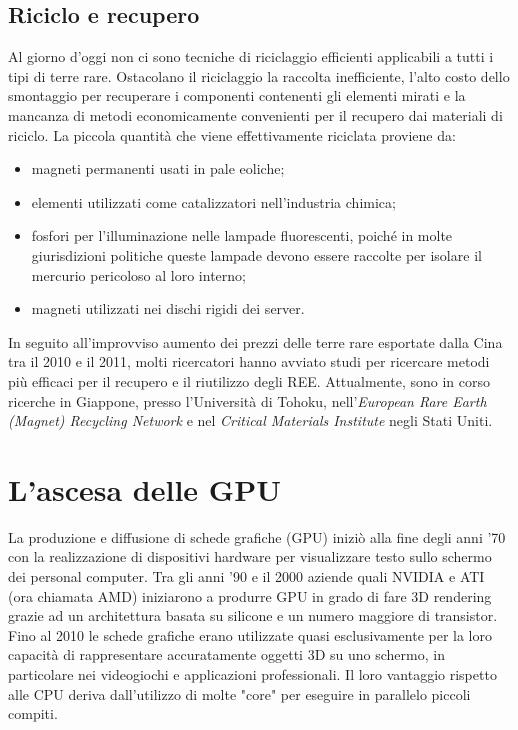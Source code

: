 \documentclass[12pt,a4paper,oneside]{book}
\begin{document}
\section{Riciclo e recupero}
Al giorno d'oggi non ci sono tecniche di riciclaggio efficienti applicabili a tutti i tipi di terre rare. Ostacolano il riciclaggio la raccolta inefficiente, l'alto costo dello smontaggio per recuperare i componenti contenenti gli elementi mirati e la mancanza di metodi economicamente convenienti per il recupero dai materiali di riciclo.
La piccola quantità che viene effettivamente riciclata proviene da:
\begin{itemize}
    \item magneti permanenti usati in pale eoliche;
    \item elementi utilizzati come catalizzatori nell'industria chimica;
    \item fosfori per l'illuminazione nelle lampade fluorescenti, poiché in molte giurisdizioni politiche queste lampade devono essere raccolte per isolare il mercurio pericoloso al loro interno;
    \item magneti utilizzati nei dischi rigidi dei server.
\end{itemize}
In seguito all'improvviso aumento dei prezzi delle terre rare esportate dalla Cina tra il 2010 e il 2011, molti ricercatori hanno avviato studi per ricercare metodi più efficaci per il recupero e il riutilizzo degli REE. Attualmente, sono in corso ricerche in Giappone, presso l'Università di Tohoku, nell'\textit{European Rare Earth (Magnet) Recycling Network} e nel \textit{Critical Materials Institute} negli Stati Uniti.

\chapter{L'ascesa delle GPU}
La produzione e diffusione di schede grafiche (GPU) iniziò alla fine degli anni '70 con la realizzazione di dispositivi hardware per visualizzare testo sullo schermo dei personal computer.
Tra gli anni '90 e il 2000 aziende quali NVIDIA e ATI (ora chiamata AMD) iniziarono a produrre GPU in grado di fare 3D rendering grazie ad un architettura basata su silicone e un numero maggiore di transistor. Fino al 2010 le schede grafiche erano utilizzate quasi esclusivamente per la loro capacità di rappresentare accuratamente oggetti 3D su uno schermo, in particolare nei videogiochi e applicazioni professionali. Il loro vantaggio rispetto alle CPU deriva dall'utilizzo di molte "core" per eseguire in parallelo piccoli compiti.
\end{document}
